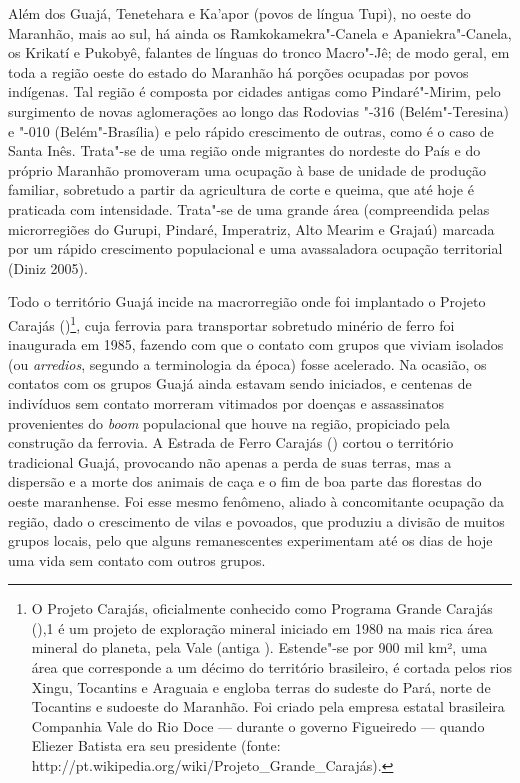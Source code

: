 Além dos Guajá, Tenetehara e Ka'apor (povos de língua Tupi), no oeste do
Maranhão, mais ao sul, há ainda os Ramkokamekra"-Canela e
Apaniekra"-Canela, os Krikatí e Pukobyê, falantes de línguas do tronco
Macro"-Jê; de modo geral, em toda a região oeste do estado do Maranhão há
porções ocupadas por povos indígenas. Tal região é composta por cidades
antigas como Pindaré"-Mirim, pelo surgimento de novas aglomerações ao
longo das Rodovias "-316 (Belém"-Teresina) e "-010 (Belém"-Brasília) e
pelo rápido crescimento de outras, como é o caso de Santa Inês. Trata"-se
de uma região onde migrantes do nordeste do País e do próprio Maranhão
promoveram uma ocupação à base de unidade de produção familiar,
sobretudo a partir da agricultura de corte e queima, que até hoje é
praticada com intensidade. Trata"-se de uma grande área (compreendida
pelas microrregiões do Gurupi, Pindaré, Imperatriz, Alto Mearim e
Grajaú) marcada por um rápido crescimento populacional e uma
avassaladora ocupação territorial (Diniz 2005).

Todo o território Guajá incide na macrorregião onde foi implantado o
Projeto Carajás ()\footnote{O Projeto Carajás, oficialmente conhecido
  como Programa Grande Carajás (),1 é um projeto de exploração mineral
  iniciado em 1980 na mais rica área mineral do planeta, pela Vale
  (antiga ). Estende"-se por 900 mil km², uma área que corresponde a
  um décimo do território brasileiro, é cortada pelos rios Xingu,
  Tocantins e Araguaia e engloba terras do sudeste do Pará, norte de
  Tocantins e sudoeste do Maranhão. Foi criado pela empresa estatal
  brasileira Companhia Vale do Rio Doce --- durante o governo Figueiredo ---
  quando Eliezer Batista era seu presidente (fonte:
  http://pt.wikipedia.org/wiki/Projeto\_Grande\_Carajás).}, cuja
ferrovia para transportar sobretudo minério de ferro foi inaugurada em
1985, fazendo com que o contato com grupos que viviam isolados (ou
\emph{arredios}, segundo a terminologia da época) fosse acelerado. Na
ocasião, os contatos com os grupos Guajá ainda estavam sendo iniciados,
e centenas de indivíduos sem contato morreram vitimados por doenças e
assassinatos provenientes do \emph{boom} populacional que houve na
região, propiciado pela construção da ferrovia. A Estrada de Ferro
Carajás () cortou o território tradicional Guajá, provocando não
apenas a perda de suas terras, mas a dispersão e a morte dos animais de
caça e o fim de boa parte das florestas do oeste maranhense. Foi esse
mesmo fenômeno, aliado à concomitante ocupação da região, dado o
crescimento de vilas e povoados, que produziu a divisão de muitos grupos
locais, pelo que alguns remanescentes experimentam até os dias de hoje
uma vida sem contato com outros grupos.

